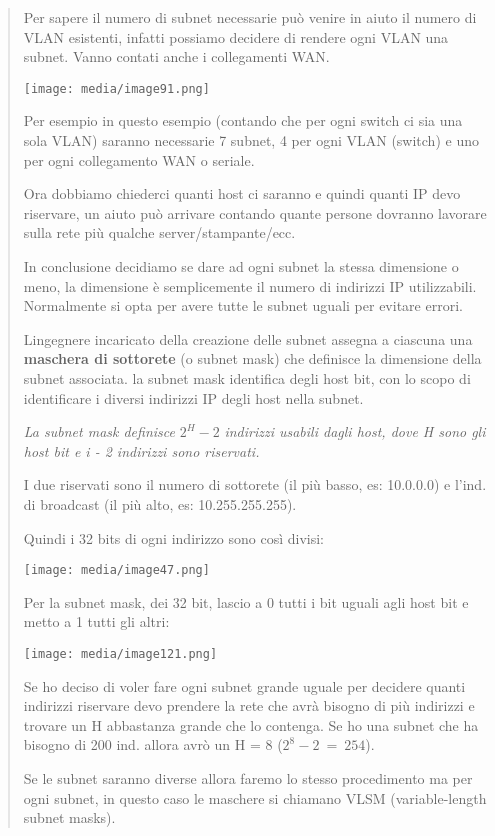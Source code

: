 \begin{quote}
Per sapere il numero di subnet necessarie può venire in aiuto il numero
di VLAN esistenti, infatti possiamo decidere di rendere ogni VLAN una
subnet. Vanno contati anche i collegamenti WAN.

\texttt{[image: media/image91.png]}

Per esempio in questo esempio (contando che per ogni switch ci sia una
sola VLAN) saranno necessarie 7 subnet, 4 per ogni VLAN (switch) e uno
per ogni collegamento WAN o seriale.

Ora dobbiamo chiederci quanti host ci saranno e quindi quanti IP devo
riservare, un aiuto può arrivare contando quante persone dovranno
lavorare sulla rete più qualche server/stampante/ecc.

In conclusione decidiamo se dare ad ogni subnet la stessa dimensione o
meno, la dimensione è semplicemente il numero di indirizzi IP
utilizzabili. Normalmente si opta per avere tutte le subnet uguali per
evitare errori.

L\textquotesingle ingegnere incaricato della creazione delle subnet
assegna a ciascuna una \textbf{maschera di sottorete} (o subnet mask)
che definisce la dimensione della subnet associata. la subnet mask
identifica degli host bit, con lo scopo di identificare i diversi
indirizzi IP degli host nella subnet.

\emph{La subnet mask definisce} \(2^{H} - 2\) \emph{indirizzi usabili
dagli host, dove H sono gli host bit e i - 2 indirizzi sono riservati.}

I due riservati sono il numero di sottorete (il più basso, es: 10.0.0.0)
e l'ind. di broadcast (il più alto, es: 10.255.255.255).

Quindi i 32 bits di ogni indirizzo sono così divisi:

\texttt{[image: media/image47.png]}

Per la subnet mask, dei 32 bit, lascio a 0 tutti i bit uguali agli host
bit e metto a 1 tutti gli altri:

\texttt{[image: media/image121.png]}

Se ho deciso di voler fare ogni subnet grande uguale per decidere quanti
indirizzi riservare devo prendere la rete che avrà bisogno di più
indirizzi e trovare un H abbastanza grande che lo contenga. Se ho una
subnet che ha bisogno di 200 ind. allora avrò un H = 8
(\(2^{8} - 2\  = \ 254\)).

Se le subnet saranno diverse allora faremo lo stesso procedimento ma per
ogni subnet, in questo caso le maschere si chiamano VLSM
(variable-length subnet masks).
\end{quote}

